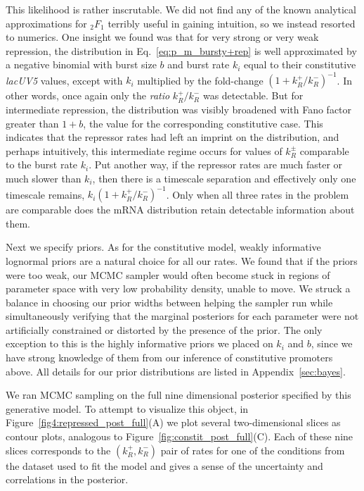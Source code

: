 This likelihood is rather inscrutable. We did not find any of the known
analytical approximations for ${_2F_1}$ terribly useful in gaining intuition, so
we instead resorted to numerics. One insight we found
was that for very strong or very weak repression, the distribution in
Eq.~\ref{eq:p_m_bursty+rep} is well approximated by a negative binomial with
burst size $b$ and burst rate $k_i$ equal to their constitutive \textit{lacUV5}
values, except with $k_i$ multiplied by the fold-change
$\left(1+k_R^+/k_R^-\right)^{-1}$. In other words, once again only the
\textit{ratio} $k_R^+/k_R^-$ was detectable. But for intermediate repression,
the distribution was visibly broadened with Fano factor greater than $1+b$, the
value for the corresponding constitutive case. This indicates that the repressor
rates had left an imprint on the distribution, and perhaps intuitively, this
intermediate regime occurs for values of $k_R^\pm$ comparable to the burst rate
$k_i$. Put another way, if the repressor rates are much faster or much slower
than $k_i$, then there is a timescale separation and effectively only one
timescale remains, $k_i\left(1+k_R^+/k_R^-\right)^{-1}$. Only when all three
rates in the problem are comparable does the mRNA distribution retain detectable
information about them.

Next we specify priors. As for the constitutive model, weakly informative
lognormal priors are a natural choice for all our rates. We found that if the
priors were too weak, our MCMC sampler would often become stuck in regions of
parameter space with very low probability density, unable to move. We struck a
balance in choosing our prior widths between helping the sampler run while
simultaneously verifying that the marginal posteriors for each parameter were
not artificially constrained or distorted by the presence of the prior. The only
exception to this is the highly informative priors we placed on $k_i$ and $b$,
since we have strong knowledge of them from our inference of constitutive
promoters above. All details for our prior distributions are listed in 
Appendix~\ref{sec:bayes}.

We ran MCMC sampling on the full nine dimensional posterior specified by this
generative model. To attempt to visualize this object, in
Figure~\ref{fig4:repressed_post_full}(A) we plot several two-dimensional slices
as contour plots, analogous to Figure~\ref{fig:constit_post_full}(C). Each of
these nine slices corresponds to the $(k_R^+, k_R^-)$ pair of rates for one of
the conditions from the dataset used to fit the model and gives a
sense of the uncertainty and correlations in the posterior.

